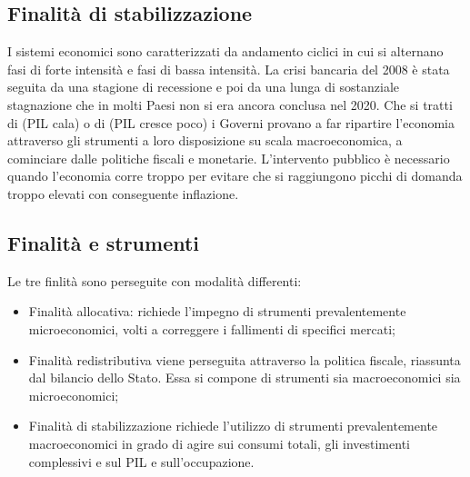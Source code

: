 \documentclass{report}
\begin{document}

\subsection{Finalità di stabilizzazione}

I sistemi economici sono caratterizzati da andamento ciclici in cui si alternano fasi di forte intensità e fasi di bassa intensità.
La crisi bancaria del 2008 è stata seguita da una stagione di recessione e poi da una lunga di sostanziale stagnazione che in molti Paesi non si era ancora conclusa nel 2020. 
Che si tratti di (PIL cala) o di (PIL cresce poco) i Governi provano a far ripartire l’economia attraverso gli strumenti a loro disposizione su scala macroeconomica, a cominciare dalle politiche fiscali e monetarie. 
L’intervento pubblico è necessario quando l’economia corre troppo per evitare che si raggiungono picchi di domanda troppo elevati con conseguente inflazione. 



\subsection{Finalità e strumenti}

Le tre finlità sono perseguite con modalità differenti:
\begin{itemize}
  \item Finalità allocativa:  richiede l’impegno di strumenti prevalentemente microeconomici, volti a correggere i fallimenti di specifici mercati;
  \item Finalità redistributiva 
viene perseguita attraverso la politica fiscale, riassunta dal bilancio dello Stato. Essa si compone di strumenti sia macroeconomici sia microeconomici; 
  \item Finalità di stabilizzazione richiede l’utilizzo di strumenti prevalentemente macroeconomici in grado di agire sui consumi totali, gli investimenti complessivi e sul PIL e sull’occupazione.
\end{itemize}
\end{document}
